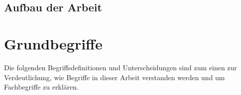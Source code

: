 \documentclass[a4paper,11pt,singlespacing]{article}
\begin{document}
	\subsection{Aufbau der Arbeit}\label{sec:EinleitungAufbau}


\section{Grundbegriffe}\label{sec:Grundbegriffe}
	Die folgenden Begriffsdefinitionen und Unterscheidungen sind zum einen zur Verdeutlichung, wie Begriffe in dieser Arbeit verstanden werden und um Fachbegriffe zu erklären.
	
\end{document}

